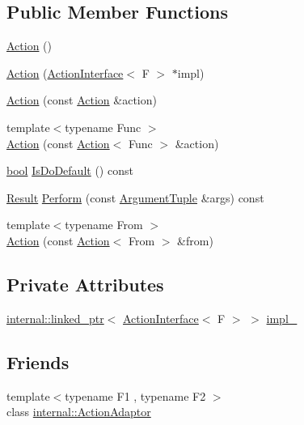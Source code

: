 \subsection*{Public Member Functions}
\begin{DoxyCompactItemize}
\item 
\hyperlink{classtesting_1_1Action_a967772922a39dd7098bee429d749f277}{Action} ()
\item 
\hyperlink{classtesting_1_1Action_a5ce44c673e3f91378777b954d88917cd}{Action} (\hyperlink{classtesting_1_1ActionInterface}{Action\+Interface}$<$ F $>$ $\ast$impl)
\item 
\hyperlink{classtesting_1_1Action_a7027316ea3a6972ce7847496eb360ccd}{Action} (const \hyperlink{classtesting_1_1Action}{Action} \&action)
\item 
{\footnotesize template$<$typename Func $>$ }\\\hyperlink{classtesting_1_1Action_a806bacddaa1f1daf61f89674564bdf0f}{Action} (const \hyperlink{classtesting_1_1Action}{Action}$<$ Func $>$ \&action)
\item 
\hyperlink{classbool}{bool} \hyperlink{classtesting_1_1Action_a4468ca2ea5e9f7363271145992d09dba}{Is\+Do\+Default} () const
\item 
\hyperlink{classtesting_1_1Action_a9af08a21ad329331fde856cba9b6dea2}{Result} \hyperlink{classtesting_1_1Action_ad00a03062885685da84b308e6e8ff4cb}{Perform} (const \hyperlink{classtesting_1_1Action_ae27fda510696a9294f991de5b1abfaf2}{Argument\+Tuple} \&args) const
\item 
{\footnotesize template$<$typename From $>$ }\\\hyperlink{classtesting_1_1Action_af23eef2fff5a92d8ff2ed7ac7a542005}{Action} (const \hyperlink{classtesting_1_1Action}{Action}$<$ From $>$ \&from)
\end{DoxyCompactItemize}
\subsection*{Private Attributes}
\begin{DoxyCompactItemize}
\item 
\hyperlink{classtesting_1_1internal_1_1linked__ptr}{internal\+::linked\+\_\+ptr}$<$ \hyperlink{classtesting_1_1ActionInterface}{Action\+Interface}$<$ F $>$ $>$ \hyperlink{classtesting_1_1Action_a878cb86f5126a22b5c6d5d8fb919f5d9}{impl\+\_\+}
\end{DoxyCompactItemize}
\subsection*{Friends}
\begin{DoxyCompactItemize}
\item 
{\footnotesize template$<$typename F1 , typename F2 $>$ }\\class \hyperlink{classtesting_1_1Action_a66fe4f9c9b9d020273151aa6054b491e}{internal\+::\+Action\+Adaptor}
\end{DoxyCompactItemize}


